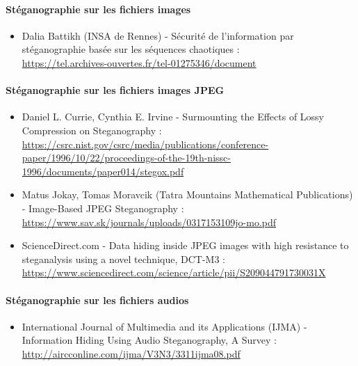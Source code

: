 \documentclass[11pt]{article}
\begin{document}
\paragraph{Stéganographie sur les fichiers images}
\begin{itemize}
    \item Dalia Battikh (INSA de Rennes) - Sécurité de l’information par
    stéganographie basée sur les séquences chaotiques : \\
    \url{https://tel.archives-ouvertes.fr/tel-01275346/document}
\end{itemize}

\paragraph{Stéganographie sur les fichiers images JPEG}
\begin{itemize}
\item Daniel L. Currie, Cynthia E. Irvine - Surmounting the Effects of Lossy
    Compression on Steganography : \\
    \url{https://csrc.nist.gov/csrc/media/publications/conference-paper/1996/10/22/proceedings-of-the-19th-nissc-1996/documents/paper014/stegox.pdf}
\item Matus Jokay, Tomas Moravcik (Tatra Mountains Mathematical Publications) -
    Image-Based JPEG Steganography : \\
    \url{https://www.sav.sk/journals/uploads/0317153109jo-mo.pdf}
\item ScienceDirect.com - Data hiding inside JPEG images with high resistance to
    steganalysis using a novel technique, DCT-M3 : \\
    \url{https://www.sciencedirect.com/science/article/pii/S209044791730031X}
\end{itemize}

\paragraph{Stéganographie sur les fichiers audios}
\begin{itemize}
\item International Journal of Multimedia and its Applications (IJMA) -
    Information Hiding Using Audio Steganography, A Survey : \\
    \url{http://aircconline.com/ijma/V3N3/3311ijma08.pdf}
\end{itemize}
\end{document}
